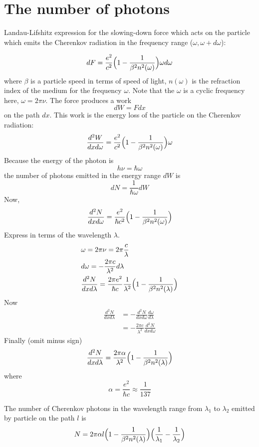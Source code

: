 \documentclass[english]{article}
\begin{document}
\section{The number of photons}

Landau-Lifshitz expression for the slowing-down force which acts on the particle which emits the Cherenkov radiation in the frequency range ($\omega, \omega+d\omega$):

$$
dF = \frac{e^2}{c^2} \Bigl( 1 - \frac{1}{\beta^2 n^2(\omega)} \Bigr) \omega d\omega
$$
where $\beta$ is a particle speed in terms of speed of light, $n(\omega)$ is the refraction index of the medium for the frequency $\omega$. Note that the $\omega$ is a cyclic frequency here, 
$\omega = 2\pi\nu$. 
The force produces a work 
$$
dW = Fdx
$$
on the path $dx$. This work is the energy loss of the particle on the Cherenkov radiation: 
$$
\frac{d^2W}{dx d\omega} = 
\frac{e^2}{c^2} \Bigl( 1 - \frac{1}{\beta^2 n^2(\omega)} \Bigr) \omega
$$
Because the energy of the photon is 
$$
h\nu = \hbar\omega
$$
the number of photons emitted in the energy range $dW$ is 
$$
dN = \frac{1}{\hbar\omega}dW
$$
Now, 
$$
\frac{d^2N}{dxd\omega} = \frac{e^2}{\hbar c^2} \Bigl( 1 - \frac{1}{\beta^2 n^2(\omega)} \Bigr)
$$
Express in terms of the wavelength $\lambda$.
\begin{align*}
& \omega = 2\pi\nu = 2\pi\frac{c}{\lambda} \\
& d\omega = -\frac{2\pi c}{\lambda^2} d\lambda \\
& \frac{d^2N}{dxd\lambda} = \frac{2\pi e^2}{\hbar c} \frac{1}{\lambda^2}
\Bigl( 1 - \frac{1}{\beta^2 n^2(\lambda)} \Bigr)\\
\end{align*}
Now 
\begin{align*}
\frac{d^2N}{dxd\lambda} & = - \frac{d^2N}{dxd\omega} \frac{d\omega}{d\lambda} \\
                        & = - \frac{2\pi c}{\lambda^2} \frac{d^2N}{dxd\omega}
\end{align*}
Finally (omit minus sign) 
$$
\frac{d^2N}{dxd\lambda} = \frac{2\pi \alpha}{\lambda^2} 
\Bigl( 1 - \frac{1}{\beta^2 n^2(\lambda)} \Bigr)
$$
where
$$
\alpha = \frac{e^2}{\hbar c} \approx \frac{1}{137}
$$

The number of Cherenkov photons in the wavelength range from $\lambda_1$ to $\lambda_2$ emitted by particle on the path $l$ is 
\begin{align*}
N = 2\pi \alpha l
\Bigl( 1 - \frac{1}{\beta^2 n^2(\lambda)} \Bigr)
\Bigl(\frac{1}{\lambda_1} - \frac{1}{\lambda_2} \Bigr)
\end{align*}
\end{document}
